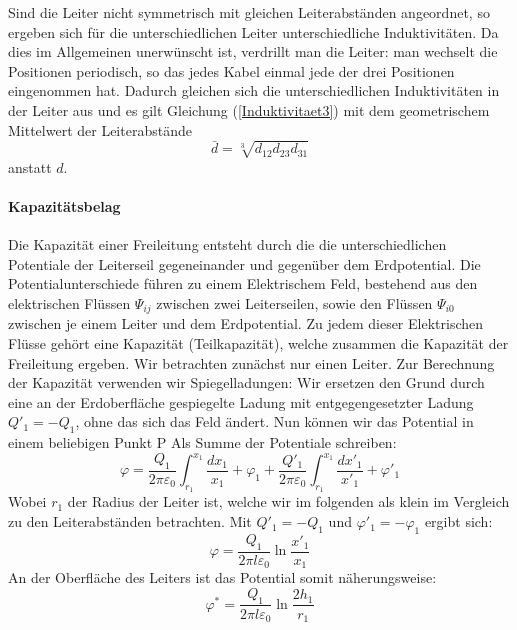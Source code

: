\documentclass[10pt,a4paper]{article}
\begin{document}
Sind die Leiter nicht symmetrisch mit gleichen Leiterabständen angeordnet, so ergeben sich für die unterschiedlichen Leiter unterschiedliche Induktivitäten. Da dies im Allgemeinen unerwünscht ist, verdrillt man die Leiter: man wechselt die Positionen periodisch, so das jedes Kabel einmal jede der drei Positionen eingenommen hat. Dadurch gleichen sich die unterschiedlichen Induktivitäten in der Leiter aus und es gilt Gleichung (\ref{Induktivitaet3}) mit dem geometrischem Mittelwert der Leiterabstände
\begin{equation}
\bar{d} = \sqrt[3]{d_{12}d_{23}d_{31}}
\end{equation}
anstatt $d$.

\paragraph{Kapazitätsbelag}
 Die Kapazität einer Freileitung entsteht durch die die unterschiedlichen Potentiale der Leiterseil gegeneinander und gegenüber dem Erdpotential. Die Potentialunterschiede führen zu einem Elektrischem Feld, bestehend aus den elektrischen Flüssen $\Psi_{ij}$ zwischen zwei Leiterseilen, sowie den Flüssen $\Psi_{i0}$ zwischen je einem Leiter und dem Erdpotential. Zu jedem dieser Elektrischen Flüsse gehört eine Kapazität (Teilkapazität), welche zusammen die Kapazität der Freileitung ergeben.
Wir betrachten zunächst nur einen Leiter. Zur Berechnung der Kapazität verwenden wir Spiegelladungen: Wir ersetzen den Grund durch eine an der Erdoberfläche gespiegelte Ladung mit entgegengesetzter Ladung $Q'_1 = - Q_1$, ohne das sich das Feld ändert. Nun können wir das Potential in einem beliebigen Punkt P Als Summe der Potentiale schreiben:
\begin{equation}
\varphi = \frac{Q_1}{2\pi\varepsilon_0} \int^{x_1}_{r_1} \frac{dx_1}{x_1} + \varphi_1 + \frac{Q'_1}{2\pi\varepsilon_0} \int^{x_1}_{r_1} \frac{dx'_1}{x'_1} + \varphi'_1
\end{equation}
Wobei $r_1$ der Radius der Leiter ist, welche wir im folgenden als klein im Vergleich zu den Leiterabständen betrachten. Mit $Q'_1 = - Q_1$ und $\varphi'_1 = - \varphi_1$ ergibt sich:
\begin{equation}\label{einleitungsfeld}
\varphi = \frac{Q_1}{2\pi l\varepsilon_0} \ln \frac{x'_1}{x_1}
\end{equation}
An der Oberfläche des Leiters ist das Potential somit näherungsweise:
\begin{equation}
\varphi^* = \frac{Q_1}{2\pi l\varepsilon_0} \ln \frac{2h_1}{r_1}
\end{equation}
\end{document}
